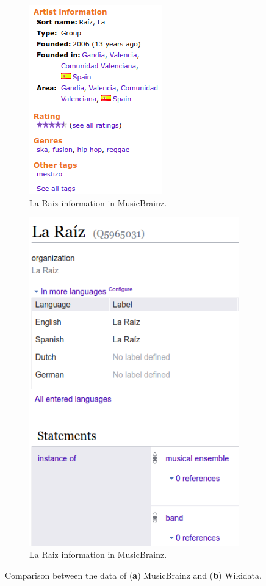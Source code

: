 \begin{figure}[t!]
	\centering
	\begin{subfigure}{0.46\columnwidth}
		\centering
		\includegraphics[width=0.7\linewidth]{images/mb-laraiz.png}
		\caption{La Raiz information in MusicBrainz.}
		\label{subfig:raiz_mb}
	\end{subfigure}
	\begin{subfigure}{0.46\columnwidth}
		\centering
		\includegraphics[width=0.63\linewidth]{images/wd-laraiz.png}
		\caption{La Raiz information in MusicBrainz.}
		\label{subfig:raiz_wd}
	\end{subfigure}

	\caption{Comparison between the data of (\textbf{a}) MusicBrainz and (\textbf{b}) Wikidata.}
	\label{fig:data-comp}
\end{figure}